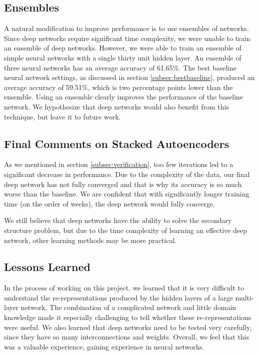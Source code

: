 \documentclass[letterpaper,twocolumn,12pt]{article}
\begin{document}
\subsection{Ensembles}
A natural modification to improve performance is to use ensembles of networks.
Since deep networks require significant time complexity, we were unable to train an ensemble of deep networks.
However, we were able to train an ensemble of simple neural networks with a single thirty unit hidden layer.
An ensemble of three neural networks has an average accuracy of 61.65\%.
The best baseline neural network settings, as discussed in section \ref{subsec:bestbaseline},
produced an average accuracy of 59.51\%, which is two percentage points lower than the ensemble.
Using an ensemble clearly improves the performance of the baseline network.
We hypothesize that deep networks would also benefit from this technique, but leave it to future work.



\subsection{Final Comments on Stacked Autoencoders}
As we mentioned in section \ref{subsec:verification}, too few iterations led to a significant decrease in performance.
Due to the complexity of the data, our final deep network has not fully converged and that is why its accuracy is so much worse than the baseline.
We are confident that with significantly longer training time (on the order of weeks), the deep network would fully converge.

We still believe that deep networks have the ability to solve the secondary structure problem, but due to the time complexity of learning an effective deep network, other learning methods may be more practical.

\subsection{Lessons Learned}
In the process of working on this project, we learned that it is very difficult to understand the re-representations produced by the hidden layers of a large multi-layer network.
The combination of a complicated network and little domain knowledge made it especially challenging to tell whether these re-representations were useful.
We also learned that deep networks need to be tested very carefully, since they have so many interconnections and weights.
Overall, we feel that this was a valuable experience, gaining experience in neural networks.
\end{document}
